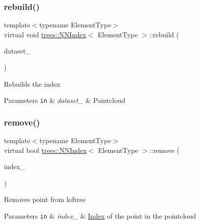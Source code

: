 \subsubsection{\texorpdfstring{rebuild()}{rebuild()}}
{\footnotesize\ttfamily template$<$typename Element\+Type$>$ \\
virtual void \hyperlink{classtrees_1_1_n_n_index}{trees\+::\+N\+N\+Index}$<$ Element\+Type $>$\+::rebuild (\begin{DoxyParamCaption}\item[{const \hyperlink{classtrees_1_1_matrix}{Matrix}$<$ Element\+Type $>$ \&}]{dataset\+\_\+ }\end{DoxyParamCaption})\hspace{0.3cm}{\ttfamily [pure virtual]}}

Rebuilds the index


\begin{DoxyParams}[1]{Parameters}
\mbox{\tt in}  & {\em dataset\+\_\+} & Pointcloud \\
\hline
\end{DoxyParams}
\mbox{\label{classtrees_1_1_n_n_index_a40d27e58adabc2f21704b9343d85a880}} 
\subsubsection{\texorpdfstring{remove()}{remove()}}
{\footnotesize\ttfamily template$<$typename Element\+Type$>$ \\
virtual bool \hyperlink{classtrees_1_1_n_n_index}{trees\+::\+N\+N\+Index}$<$ Element\+Type $>$\+::remove (\begin{DoxyParamCaption}\item[{size\+\_\+t}]{index\+\_\+ }\end{DoxyParamCaption})\hspace{0.3cm}{\ttfamily [pure virtual]}}

Removes point from kdtree


\begin{DoxyParams}[1]{Parameters}
\mbox{\tt in}  & {\em index\+\_\+} & \hyperlink{classtrees_1_1_index}{Index} of the point in the pointcloud \\
\hline
\end{DoxyParams}
\mbox{\label{classtrees_1_1_n_n_index_a0f02fa0888a3c93b38465ccd37517ba1}} 
